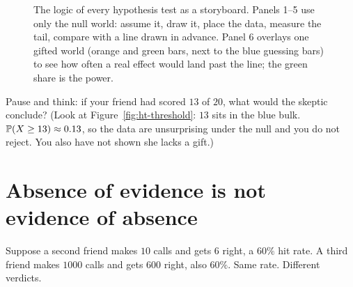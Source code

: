 \begin{figure}[H]
\caption{The logic of every hypothesis test as a storyboard. Panels 1--5 use only
the null world: assume it, draw it, place the data, measure the tail, compare with a
line drawn in advance. Panel 6 overlays one gifted world (orange and green bars,
next to the blue guessing bars) to see how often a real effect would land past the
line; the green share is the power.}
\label{fig:ht-flow}
\end{figure}

\begin{recoverybox}
Pause and think: if your friend had scored $13$ of $20$, what would the skeptic
conclude? (Look at Figure~\ref{fig:ht-threshold}: $13$ sits in the blue bulk.
$\P(X\ge 13)\approx 0.13$, so the data are unsurprising under the null and you do not
reject. You also have not shown she lacks a gift.)
\end{recoverybox}

\section{Absence of evidence is not evidence of absence}
\label{sec:ht-absence}

Suppose a second friend makes $10$ calls and gets $6$ right, a $60\%$ hit rate. A
third friend makes $1000$ calls and gets $600$ right, also $60\%$. Same rate. Different
verdicts.

